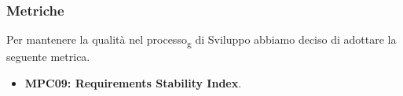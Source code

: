 \subsubsection{Metriche}
Per mantenere la qualità nel processo\textsubscript{g} di Sviluppo abbiamo deciso di adottare la seguente metrica.
\begin{itemize}
    \item \textbf{MPC09: Requirements Stability Index}.
\end{itemize}
